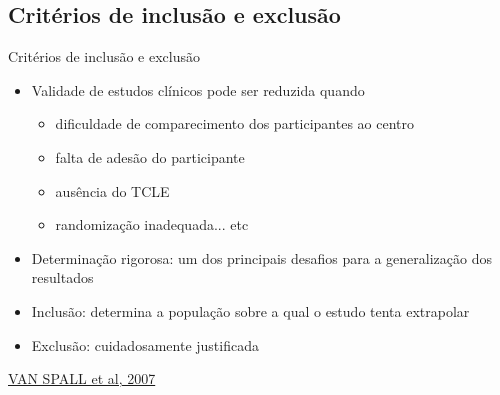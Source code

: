 \documentclass{beamer}
\begin{document}

\subsection{Critérios de inclusão e exclusão}

\begin{frame}{Critérios de inclusão e exclusão}
  \begin{itemize}
    \footnotesize
  \item Validade de estudos clínicos pode ser reduzida quando
    \begin{itemize}
      \scriptsize
    \item dificuldade de comparecimento dos participantes ao centro
    \item falta de adesão do participante
    \item ausência do TCLE
    \item randomização inadequada... etc
    \end{itemize}
    \medskip
  \item Determinação rigorosa: um dos principais desafios para a generalização dos resultados
    \medskip
  \item Inclusão: determina a população sobre a qual o estudo tenta extrapolar
    \medskip
  \item Exclusão: cuidadosamente justificada
  \end{itemize}

  \vfill
  \scriptsize
  \hfill \href{https://doi.org/10.1001/jama.297.11.1233}{VAN SPALL et al, 2007}
\end{frame}
\end{document}
